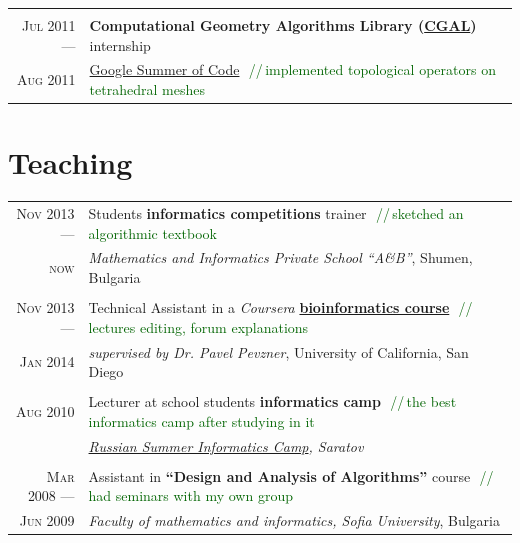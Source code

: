 \documentclass[a4paper,10pt]{article}
\def\myline{\color{linegray}\vline}
\newcommand{\minorcolor}[1]{\textcolor{mygray}{#1}}
\newcommand{\comment}[1]{\small\textcolor{darkgreen}{\,\,//\,#1}}
\newcommand{\mydate}[1]{\minorcolor{\textsc{#1}}}
\begin{document}
{\begin{tabular}{r!{\myline}p{14cm}}
        \\
        \mydate{Jul 2011 ---}       &   \textbf{Computational Geometry Algorithms Library (\href{http://www.cgal.org/}{CGAL})} internship\\
        \mydate{Aug 2011}           &   \href{http://code.google.com/soc/}{Google Summer of Code}
                                        \comment{implemented topological operators on tetrahedral meshes}\\
\end{tabular}


\section{Teaching}
\hspace{0mm}\begin{tabular}{r!{\myline}p{14cm}}
        \mydate{Nov 2013 ---}       &   Students \textbf{informatics competitions} trainer
                                        \comment{sketched an algorithmic textbook}\\
        \mydate{now}                &   \textit{Mathematics and Informatics Private School ``A\&B''}, Shumen, Bulgaria\\ %

        \\
        \mydate{Nov 2013 ---}       &   Technical Assistant in a \textit{Coursera} \textbf{\href{https://www.coursera.org/course/bioinformatics}{bioinformatics course}}
                                        \comment{lectures editing, forum explanations}\\
        \mydate{Jan 2014}           &   \textit{supervised by Dr. Pavel Pevzner}, University of California, San Diego\\
	
        \\
        \mydate{Aug 2010}           &   Lecturer at school students \textbf{informatics camp}
                                        \comment{the best informatics camp after studying in it}\\
                                    &   \textit{\href{http://lksh.ru/}{Russian Summer Informatics Camp}, Saratov}\\
	
	\\
	\mydate{Mar 2008 ---}       &   Assistant in \textbf{``Design and Analysis of Algorithms''} course
                                        \comment{had seminars with my own group}\\
	\mydate{Jun 2009}           &   \textit{Faculty of mathematics and informatics, Sofia University}, Bulgaria\\
\end{tabular}


}
\end{document}
